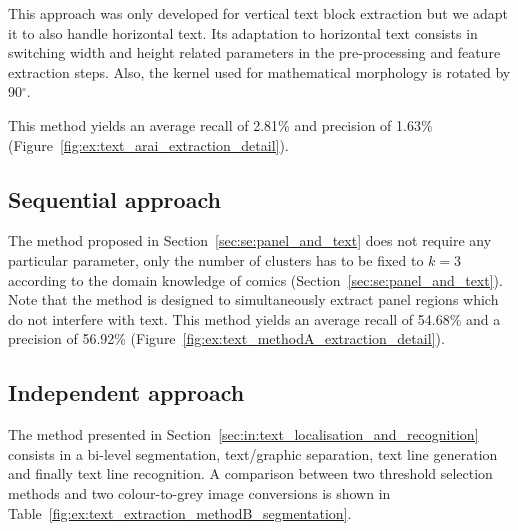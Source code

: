 This approach was only developed for vertical text block extraction but we adapt it to also handle horizontal text.
Its adaptation to horizontal text consists in switching width and height related parameters in the pre-processing and feature extraction steps.
Also, the kernel used for mathematical morphology is rotated by 90$^{\circ}$.

This method yields an average recall of 2.81\% and precision of 1.63\% (Figure~\ref{fig:ex:text_arai_extraction_detail}).

\subsection{Sequential approach} %
The method proposed in Section~\ref{sec:se:panel_and_text} does not require any particular parameter, only the number of clusters has to be fixed to $k=3$ according to the domain knowledge of comics (Section~\ref{sec:se:panel_and_text}).
Note that the method is designed to simultaneously extract panel regions which do not interfere with text.
This method yields an average recall of 54.68\% and a precision of 56.92\% (Figure~\ref{fig:ex:text_methodA_extraction_detail}).



\subsection{Independent approach} %
\label{sub:ex:text_extraction_evaluation_method_b}

The method presented in Section~\ref{sec:in:text_localisation_and_recognition} consists in a bi-level segmentation, text/graphic separation, text line generation and finally text line recognition.
A comparison between two threshold selection methods and two colour-to-grey image conversions is shown in Table~\ref{fig:ex:text_extraction_methodB_segmentation}.


